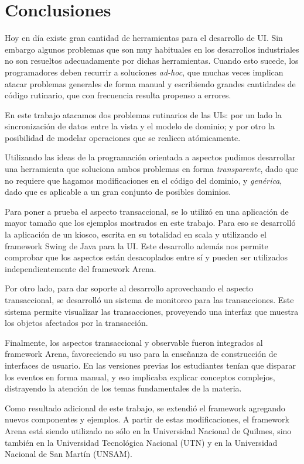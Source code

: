 \section{Conclusiones}
\label{Conclusions}
Hoy en día existe gran cantidad de herramientas para el
desarrollo de UI. Sin embargo algunos problemas que son muy habituales en los desarrollos
industriales no son resueltos adecuadamente por dichas herramientas.
Cuando esto sucede, los programadores deben recurrir a soluciones
\emph{ad-hoc},  que muchas veces implican atacar problemas generales de forma
manual y escribiendo grandes cantidades de código rutinario, que con
frecuencia resulta propenso a errores.

En este trabajo atacamos dos problemas rutinarios de las UIs:
por un lado la sincronización de datos entre la vista y el modelo de dominio; y
por otro la posibilidad de modelar operaciones que se realicen atómicamente.

Utilizando las ideas de la programación orientada a aspectos pudimos desarrollar
una herramienta que soluciona ambos problemas en forma \emph{transparente}, dado
que no requiere que hagamos modificaciones en el código del dominio, y \emph{genérica},
dado que es aplicable a un gran conjunto de posibles dominios.

\medskip

Para poner a prueba el aspecto transaccional, se lo utilizó en una aplicación de mayor 
tamaño que los ejemplos mostrados en este trabajo.
Para eso se desarrolló la aplicación de un kiosco, escrita en su totalidad en
scala y utilizando el framework Swing de Java para la UI.
Este desarrollo además nos permite comprobar que los aspectos están desacoplados
entre sí y pueden ser utilizados independientemente del framework Arena.


Por otro lado, para dar soporte al desarrollo aprovechando el aspecto transaccional, 
se desarrolló un sistema de monitoreo para las transacciones.
Este sistema permite visualizar las transacciones, proveyendo una interfaz que muestra los
objetos afectados por la transacción.

\medskip

Finalmente, los aspectos transaccional y observable fueron integrados al framework Arena, 
favoreciendo su uso para la enseñanza de construcción de interfaces de usuario.
En las versiones previas los estudiantes tenían que disparar los eventos en forma
manual, y eso implicaba explicar conceptos complejos, distrayendo la atención de
los temas fundamentales de la materia.

Como resultado adicional de este trabajo, se extendió el framework agregando nuevos componentes y ejemplos. 
A partir de estas modificaciones, el framework Arena está siendo utilizado no
sólo en la Universidad Nacional de Quilmes, sino también en la Universidad
Tecnológica Nacional (UTN) y en la Universidad Nacional de San Martín (UNSAM).
